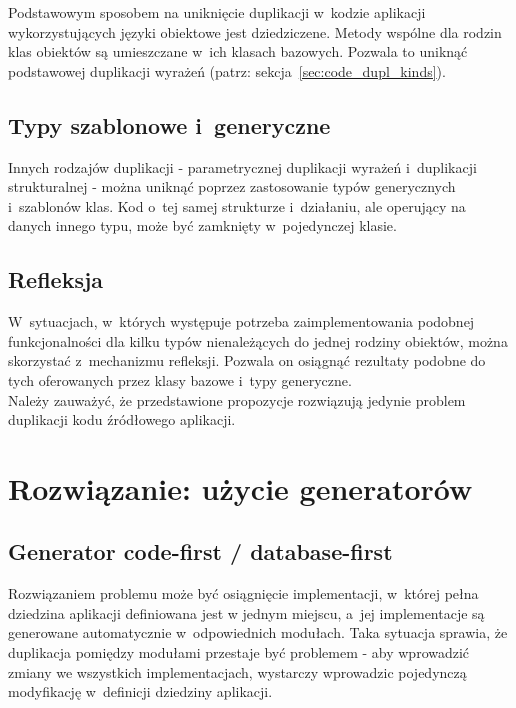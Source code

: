 Podstawowym sposobem na uniknięcie duplikacji w~kodzie aplikacji wykorzystujących języki obiektowe jest dziedziczene.
Metody wspólne dla rodzin klas obiektów są umieszczane w~ich klasach bazowych.
Pozwala to uniknąć podstawowej duplikacji wyrażeń (patrz: sekcja~\ref{sec:code_dupl_kinds}).


\subsection{Typy szablonowe i~generyczne}

Innych rodzajów duplikacji - parametrycznej duplikacji wyrażeń i~duplikacji strukturalnej - można uniknąć poprzez zastosowanie typów generycznych i~szablonów klas.
Kod o~tej samej strukturze i~działaniu, ale operujący na danych innego typu, może być zamknięty w~pojedynczej klasie.


\subsection{Refleksja}

W~sytuacjach, w~których występuje potrzeba zaimplementowania podobnej funkcjonalności dla kilku typów nienależących do jednej rodziny obiektów, można skorzystać z~mechanizmu refleksji.
Pozwala on osiągnąć rezultaty podobne do tych oferowanych przez klasy bazowe i~typy generyczne.\\


Należy zauważyć, że przedstawione propozycje rozwiązują jedynie problem duplikacji kodu źródłowego aplikacji.


\section{Rozwiązanie: użycie generatorów}



\subsection{Generator code-first / database-first}

Rozwiązaniem problemu może być osiągnięcie implementacji, w~której pełna dziedzina aplikacji definiowana jest w jednym miejscu, a~jej implementacje są generowane automatycznie w~odpowiednich modułach.
Taka sytuacja sprawia, że duplikacja pomiędzy modułami przestaje być problemem - aby wprowadzić zmiany we wszystkich implementacjach, wystarczy wprowadzic pojedynczą modyfikację w~definicji dziedziny aplikacji.

